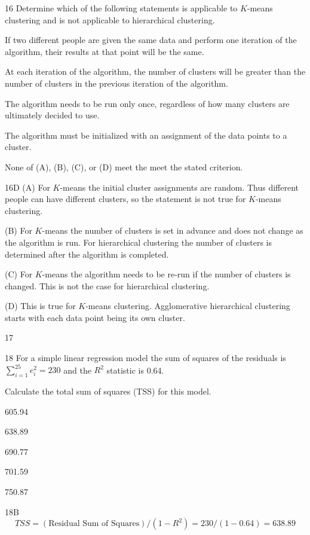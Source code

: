 \begin{question}{16}
Determine which of the following statements is applicable to $K$-means clustering and is not applicable to hierarchical clustering.

\begin{choices}
\item If two different people are given the same data and perform one iteration of the algorithm, their results at that point will be the same.
\item At each iteration of the algorithm, the number of clusters will be greater than the number of clusters in the previous iteration of the algorithm.
\item The algorithm needs to be run only once, regardless of how many clusters are ultimately decided to use.
\item The algorithm must be initialized with an assignment of the data points to a cluster.
\item None of (A), (B), (C), or (D) meet the meet the stated criterion.
\end{choices}
\end{question}
\begin{solution}{16}{D}
(A) For $K$-means the initial cluster assignments are random. Thus different people can have different clusters, so the statement is not true for $K$-means clustering.

(B) For $K$-means the number of clusters is set in advance and does not change as the algorithm is run. For hierarchical clustering the number of clusters is determined after the algorithm is completed.

(C) For $K$-means the algorithm needs to be re-run if the number of clusters is changed. This is not the case for hierarchical clustering.

(D) This is true for $K$-means clustering. Agglomerative hierarchical clustering starts with each data point being its own cluster.
\end{solution}

\begin{question}{17}
\deleted
\end{question}

\begin{question}{18}
For a simple linear regression model the sum of squares of the residuals is $\sum_{i=1}^{25} e_i^2 = 230$ and the $R^2$ statistic is 0.64.

Calculate the total sum of squares (TSS) for this model.

\begin{choices}
\item 605.94
\item 638.89
\item 690.77
\item 701.59
\item 750.87
\end{choices}
\end{question}
\begin{solution}{18}{B}
\[ TSS = (\text{Residual Sum of Squares})/(1 - R^2) = 230/(1 - 0.64) = 638.89 \]
\end{solution}

